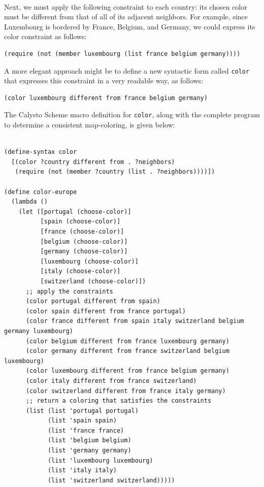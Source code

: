 \documentclass[acmsmall,screen,authorversion]{acmart}
\begin{document}
\noindent\\
Next, we must apply the following constraint to each country: its chosen color
must be different from that of all of its adjacent neighbors.  For example,
since Luxembourg is bordered by France, Belgium, and Germany, we could express
its color constraint as follows:

\noindent
{\footnotesize
\begin{verbatim}
(require (not (member luxembourg (list france belgium germany))))
\end{verbatim}
}

\noindent
A more elegant approach might be to define a new syntactic form called
\texttt{color} that expresses this constraint in a very readable way, as
follows:

\noindent
{\footnotesize
\begin{verbatim}
(color luxembourg different from france belgium germany)
\end{verbatim}}

\noindent
The Calysto Scheme macro definition for \texttt{color}, along with the complete
program to determine a consistent map-coloring, is given below:

\noindent
{\footnotesize
\begin{verbatim}

(define-syntax color
  [(color ?country different from . ?neighbors)
   (require (not (member ?country (list . ?neighbors))))])

(define color-europe
  (lambda ()
    (let ([portugal (choose-color)]
          [spain (choose-color)]
          [france (choose-color)]
          [belgium (choose-color)]
          [germany (choose-color)]
          [luxembourg (choose-color)]
          [italy (choose-color)]
          [switzerland (choose-color)])
      ;; apply the constraints
      (color portugal different from spain)
      (color spain different from france portugal)
      (color france different from spain italy switzerland belgium germany luxembourg)
      (color belgium different from france luxembourg germany)
      (color germany different from france switzerland belgium luxembourg)
      (color luxembourg different from france belgium germany)
      (color italy different from france switzerland)
      (color switzerland different from france italy germany)
      ;; return a coloring that satisfies the constraints
      (list (list 'portugal portugal)
            (list 'spain spain)
            (list 'france france)
            (list 'belgium belgium)
            (list 'germany germany)
            (list 'luxembourg luxembourg)
            (list 'italy italy)
            (list 'switzerland switzerland)))))
\end{verbatim}
}
\end{document}

